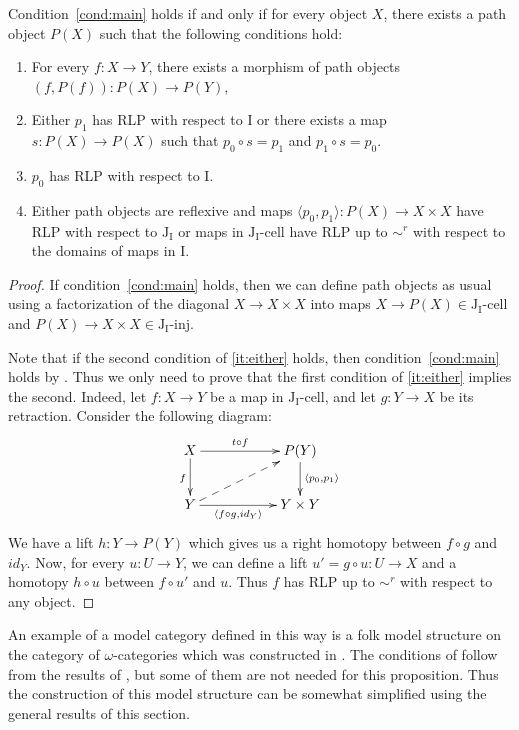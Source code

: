 \documentclass{tac}
\theoremstyle{definition}
\newcommand{\I}{\mathrm{I}}
\newcommand{\J}{\mathrm{J}}
\newcommand{\class}[2]{#1\text{-}\mathrm{#2}}
\newcommand{\Iinj}[1][\I]{\class{#1}{inj}}
\newcommand{\Icell}[1][\I]{\class{#1}{cell}}
\newcommand{\Jinj}[1][]{\Iinj[\J#1]}
\newcommand{\Jcell}[1][]{\Icell[\J#1]}
\begin{document}
\begin{prop}
Condition~\eqref{cond:main} holds if and only if for every object $X$,
there exists a path object $P(X)$ such that the following conditions hold:
\begin{enumerate}
\item For every $f : X \to Y$, there exists a morphism of path objects $(f,P(f)) : P(X) \to P(Y)$,
\item Either $p_1$ has RLP with respect to $\I$ or there exists a map $s : P(X) \to P(X)$ such that $p_0 \circ s = p_1$ and $p_1 \circ s = p_0$.
\item $p_0$ has RLP with respect to $\I$.
\item \label{it:either} Either path objects are reflexive and maps $\langle p_0, p_1 \rangle : P(X) \to X \times X$ have RLP with respect to $\J_\I$
or maps in $\Jcell[_\I]$ have RLP up to $\sim^r$ with respect to the domains of maps in $\I$.
\end{enumerate}
\end{prop}
\begin{proof}
If condition~\eqref{cond:main} holds, then we can define path objects as usual using a factorization
of the diagonal $X \to X \times X$ into maps $X \to P(X) \in \Jcell[_\I]$ and $P(X) \to X \times X \in \Jinj[_\I]$.

Note that if the second condition of \eqref{it:either} holds, then condition~\eqref{cond:main} holds by .
Thus we only need to prove that the first condition of \eqref{it:either} implies the second.
Indeed, let $f : X \to Y$ be a map in $\Jcell[_\I]$, and let $g : Y \to X$ be its retraction.
Consider the following diagram:
\[ \xymatrix{ X \ar[rr]^-{t \circ f} \ar[d]_f & & P(Y) \ar[d]^{\langle p_0, p_1 \rangle} \\
              Y \ar[rr]_-{\langle f \circ g, id_Y \rangle} \ar@{-->}[urr] & & Y \times Y
            } \]
We have a lift $h : Y \to P(Y)$ which gives us a right homotopy between $f \circ g$ and $id_Y$.
Now, for every $u : U \to Y$, we can define a lift $u' = g \circ u : U \to X$ and a homotopy $h \circ u$ between $f \circ u'$ and $u$.
Thus $f$ has RLP up to $\sim^r$ with respect to any object.
\end{proof}

\begin{exmp}
An example of a model category defined in this way is a folk model structure on the category of $\omega$-categories which was constructed in \cite{folk}.
The conditions of  follow from the results of \cite{folk}, but some of them are not needed for this proposition.
Thus the construction of this model structure can be somewhat simplified using the general results of this section.
\end{exmp}
\end{document}

